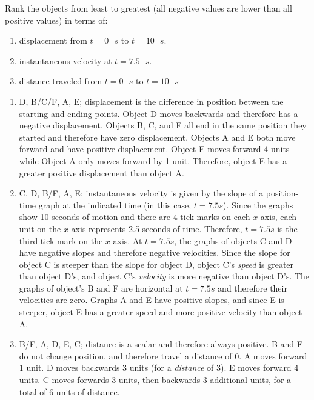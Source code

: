 \begin{Exercise}[label = graphs]
Rank the objects from least to greatest (all negative values are lower than 
all positive values) in terms of:
\begin{enumerate}
    \item displacement from $t = 0\text{ }s$ to $t = 10\text{ }s$.
    \item instantaneous velocity at $t = 7.5\text{ }s$.
    \item distance traveled from $t = 0\text{ }s$ to $t = 10\text{ }s$
\end{enumerate}
\end{Exercise}

\begin{Answer}[ref = graphs]
\begin{enumerate}
	\item D, B/C/F, A, E; displacement is the difference in position between the 
	starting and ending points. Object D moves backwards and therefore has a 
	negative displacement. Objects B, C, and F all end in the same position they 
	started and therefore have zero displacement. Objects A and E both move 
	forward and have positive displacement. Object E moves forward 4 units while 
	Object A only moves forward by 1 unit. Therefore, object E has a greater 
	positive displacement than object A.  
	\item C, D, B/F, A, E; instantaneous velocity is given by the slope of a 
	position-time graph at the indicated time (in this case, $t = 7.5s$). Since 
	the graphs show 10 seconds of motion and there are 4 tick marks on each 
	$x$-axis, each unit on the $x$-axis represents 2.5 seconds of time. Therefore, 
	$t = 7.5s$ is the third tick mark on the $x$-axis. At $t = 7.5s$, the graphs of 
	objects C and D have negative slopes and therefore negative velocities. Since 
	the slope for object C is steeper than the slope for object D, object C's 
	\textit{speed} is greater than object D's, and object C's \textit{velocity} 
	is more negative than object D's. The graphs of object's B and F are horizontal 
	at $t=7.5s$ and therefore their velocities are zero. Graphs A and E have 
	positive slopes, and since E is steeper, object E has a greater speed and 
	more positive velocity than object A. 
	\item B/F, A, D, E, C; distance is a scalar and therefore always positive. B 
	and F do not change position, and therefore travel a distance of 0. A moves 
	forward 1 unit. D moves backwards 3 units (for a \textit{distance} of 3). E 
	moves forward 4 units. C moves forwards 3 units, then backwards 3 additional 
	units, for a total of 6 units of distance. 
\end{enumerate}
\end{Answer}


